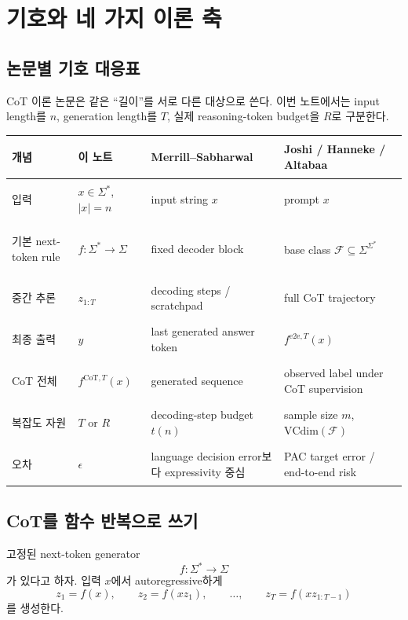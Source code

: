 \documentclass[11pt,a4paper,oneside,openany]{memoir}
\newcommand{\F}{\mathcal{F}}
\newcommand{\VC}{\mathrm{VCdim}}
\theoremstyle{definition}
\begin{document}
\tableofcontents*
\clearpage

\chapter{기호와 네 가지 이론 축}

\section{논문별 기호 대응표}

CoT 이론 논문은 같은 ``길이''를 서로 다른 대상으로 쓴다.
이번 노트에서는 input length를 $n$, generation length를 $T$, 실제 reasoning-token budget을 $R$로 구분한다.

\begin{center}
\small
\begin{tabularx}{\textwidth}{>{\bfseries\raggedright\arraybackslash}p{}Y Y Y}
\toprule
개념 & 이 노트 & Merrill--Sabharwal & Joshi / Hanneke / Altabaa \\
\midrule
입력 & $x\in\Sigma^*$, $|x|=n$ & input string $x$ & prompt $x$ \\
기본 next-token rule & $f:\Sigma^*\to\Sigma$ & fixed decoder block & base class $\F\subseteq\Sigma^{\Sigma^*}$ \\
중간 추론 & $z_{1:T}$ & decoding steps / scratchpad & full CoT trajectory \\
최종 출력 & $y$ & last generated answer token & $f^{\mathrm{e2e},T}(x)$ \\
CoT 전체 & $f^{\mathrm{CoT},T}(x)$ & generated sequence & observed label under CoT supervision \\
복잡도 자원 & $T$ or $R$ & decoding-step budget $t(n)$ & sample size $m$, $\VC(\F)$ \\
오차 & $\epsilon$ & language decision error보다 expressivity 중심 & PAC target error / end-to-end risk \\
\bottomrule
\end{tabularx}
\end{center}

\section{CoT를 함수 반복으로 쓰기}

고정된 next-token generator
\[
f:\Sigma^*\to\Sigma
\]
가 있다고 하자. 입력 $x$에서 autoregressive하게
\[
z_1=f(x),
\qquad
z_2=f(xz_1),
\qquad
\ldots,
\qquad
z_T=f(xz_{1:T-1})
\]
를 생성한다.
\end{document}
